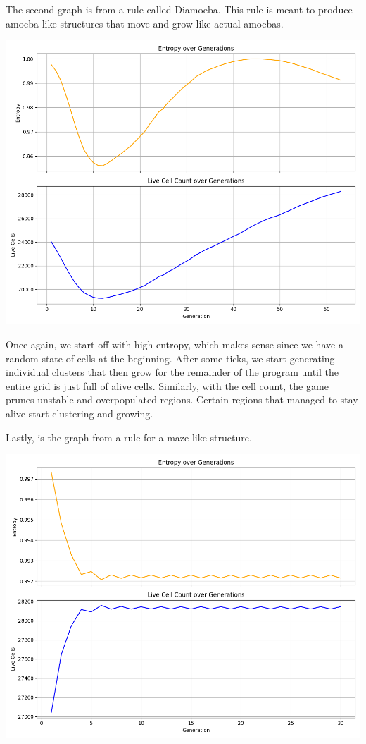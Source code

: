\documentclass[12pt]{article}
\begin{document}
The second graph is from a rule called Diamoeba. This rule is meant to produce amoeba-like structures that move and grow like actual amoebas.

\includegraphics[scale=0.6]{../figures/Figure_2.png}

Once again, we start off with high entropy, which makes sense since we have a random state of cells at the beginning. After some ticks, we start generating individual clusters that then grow for the remainder of the program until the entire grid is just full of alive cells. Similarly, with the cell count, the game prunes unstable and overpopulated regions. Certain regions that managed to stay alive start clustering and growing.

Lastly, is the graph from a rule for a maze-like structure.

\includegraphics[scale=0.6]{../figures/Figure_3.png}
\end{document}
